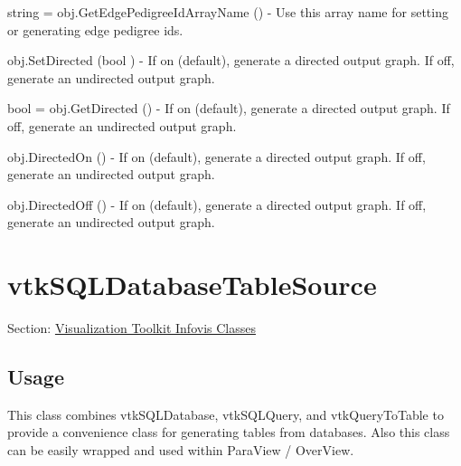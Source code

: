 \begin{DoxyItemize}
\item {\ttfamily string = obj.\-Get\-Edge\-Pedigree\-Id\-Array\-Name ()} -\/ Use this array name for setting or generating edge pedigree ids.  
\item {\ttfamily obj.\-Set\-Directed (bool )} -\/ If on (default), generate a directed output graph. If off, generate an undirected output graph.  
\item {\ttfamily bool = obj.\-Get\-Directed ()} -\/ If on (default), generate a directed output graph. If off, generate an undirected output graph.  
\item {\ttfamily obj.\-Directed\-On ()} -\/ If on (default), generate a directed output graph. If off, generate an undirected output graph.  
\item {\ttfamily obj.\-Directed\-Off ()} -\/ If on (default), generate a directed output graph. If off, generate an undirected output graph.  
\end{DoxyItemize}\hypertarget{vtkinfovis_vtksqldatabasetablesource}{}\section{vtk\-S\-Q\-L\-Database\-Table\-Source}\label{vtkinfovis_vtksqldatabasetablesource}
Section\-: \hyperlink{sec_vtkinfovis}{Visualization Toolkit Infovis Classes} \hypertarget{vtkwidgets_vtkxyplotwidget_Usage}{}\subsection{Usage}\label{vtkwidgets_vtkxyplotwidget_Usage}
This class combines vtk\-S\-Q\-L\-Database, vtk\-S\-Q\-L\-Query, and vtk\-Query\-To\-Table to provide a convenience class for generating tables from databases. Also this class can be easily wrapped and used within Para\-View / Over\-View.

